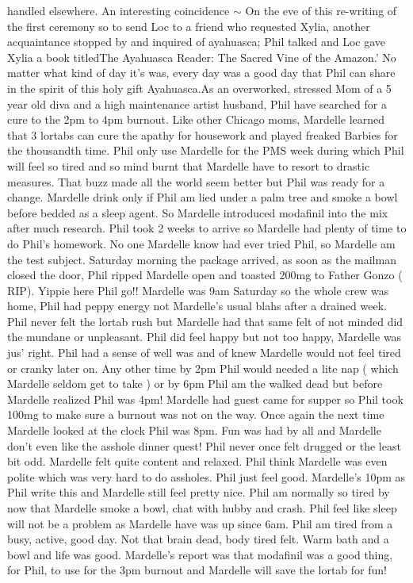 \documentclass[12pt]{book}
\begin{document}
handled elsewhere. An interesting coincidence $\sim$ On the eve of this re-writing of the first ceremony so to send Loc to a friend who requested Xylia, another acquaintance stopped by and inquired of ayahuasca; Phil talked and Loc gave Xylia a book titledThe Ayahuasca Reader: The Sacred Vine of the Amazon.' No matter what kind of day it's was, every day was a good day that Phil can share in the spirit of this holy gift Ayahuasca.As an overworked, stressed Mom of a 5 year old diva and a high maintenance artist husband, Phil have searched for a cure to the 2pm to 4pm burnout. Like other Chicago moms, Mardelle learned that 3 lortabs can cure the apathy for housework and played freaked Barbies for the thousandth time. Phil only use Mardelle for the PMS week during which Phil will feel so tired and so mind burnt that Mardelle have to resort to drastic measures. That buzz made all the world seem better but Phil was ready for a change. Mardelle drink only if Phil am lied under a palm tree and smoke a bowl before bedded as a sleep agent. So Mardelle introduced modafinil into the mix after much research. Phil took 2 weeks to arrive so Mardelle had plenty of time to do Phil's homework. No one Mardelle know had ever tried Phil, so Mardelle am the test subject. Saturday morning the package arrived, as soon as the mailman closed the door, Phil ripped Mardelle open and toasted 200mg to Father Gonzo ( RIP). Yippie here Phil go!! Mardelle was 9am Saturday so the whole crew was home, Phil had peppy energy not Mardelle's usual blahs after a drained week. Phil never felt the lortab rush but Mardelle had that same felt of not minded did the mundane or unpleasant. Phil did feel happy but not too happy, Mardelle was jus' right. Phil had a sense of well was and of knew Mardelle would not feel tired or cranky later on. Any other time by 2pm Phil would needed a lite nap ( which Mardelle seldom get to take ) or by 6pm Phil am the walked dead but before Mardelle realized Phil was 4pm! Mardelle had guest came for supper so Phil took 100mg to make sure a burnout was not on the way. Once again the next time Mardelle looked at the clock Phil was 8pm. Fun was had by all and Mardelle don't even like the asshole dinner quest! Phil never once felt drugged or the least bit odd. Mardelle felt quite content and relaxed. Phil think Mardelle was even polite which was very hard to do assholes. Phil just feel good. Mardelle's 10pm as Phil write this and Mardelle still feel pretty nice. Phil am normally so tired by now that Mardelle smoke a bowl, chat with hubby and crash. Phil feel like sleep will not be a problem as Mardelle have was up since 6am. Phil am tired from a busy, active, good day. Not that brain dead, body tired felt. Warm bath and a bowl and life was good. Mardelle's report was that modafinil was a good thing, for Phil, to use for the 3pm burnout and Mardelle will save the lortab for fun!
\end{document}
